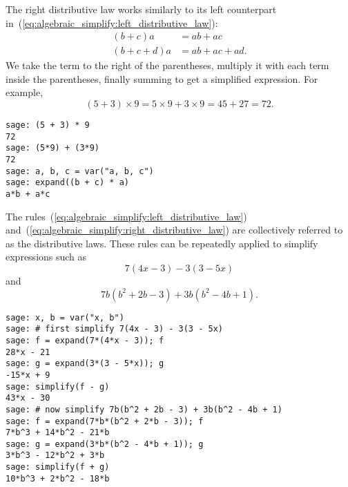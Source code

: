 The right distributive law works
similarly to its left counterpart
in~(\ref{eq:algebraic_simplify:left_distributive_law}):
%
\begin{equation}
\label{eq:algebraic_simplify:right_distributive_law}
\begin{aligned}
(b + c)a &= ab + ac \\
(b + c + d)a &= ab + ac + ad.
\end{aligned}
\end{equation}
%
We take the term to the right of the parentheses, multiply it with
each term inside the parentheses, finally summing to get a simplified
expression. For example,
\[
(5 + 3) \times 9
=
5 \times 9 + 3 \times 9
=
45 + 27
=
72.
\]

\begin{lstlisting}
sage: (5 + 3) * 9
72
sage: (5*9) + (3*9)
72
sage: a, b, c = var("a, b, c")
sage: expand((b + c) * a)
a*b + a*c
\end{lstlisting}

The rules~(\ref{eq:algebraic_simplify:left_distributive_law})
and~(\ref{eq:algebraic_simplify:right_distributive_law}) are
collectively referred to as the distributive laws.
These rules can be repeatedly applied to simplify expressions such as
\[
7(4x - 3) - 3(3 - 5x)
\]
and
\[
7b(b^2 + 2b - 3) + 3b(b^2 - 4b + 1).
\]

\begin{lstlisting}
sage: x, b = var("x, b")
sage: # first simplify 7(4x - 3) - 3(3 - 5x)
sage: f = expand(7*(4*x - 3)); f
28*x - 21
sage: g = expand(3*(3 - 5*x)); g
-15*x + 9
sage: simplify(f - g)
43*x - 30
sage: # now simplify 7b(b^2 + 2b - 3) + 3b(b^2 - 4b + 1)
sage: f = expand(7*b*(b^2 + 2*b - 3)); f
7*b^3 + 14*b^2 - 21*b
sage: g = expand(3*b*(b^2 - 4*b + 1)); g
3*b^3 - 12*b^2 + 3*b
sage: simplify(f + g)
10*b^3 + 2*b^2 - 18*b
\end{lstlisting}
